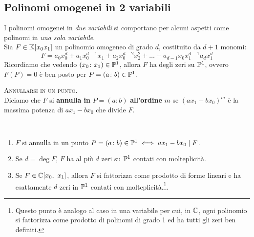 	\subsection{Polinomi omogenei in 2 variabili}
I polinomi omogenei in \textit{due variabili} si comportano per alcuni aspetti come polinomi in \textit{una sola variabile}.\\
Sia $F\in\mathbb{K}[x_0x_1]$ un polinomio omogeneo di grado $d$, costituito da $d+1$ monomi:
\begin{equation*}
	F=a_0x_0^d+a_1x_0^{d-1}x_1+a_2x_0^{d-2}x_2^2+\ldots + a_{d-1}x_0x_1^{d-1}a_dx_1^d
\end{equation*}
Ricordiamo che vedendo $\left(x_0\colon x_1\right)\in\proj[1]{\ }$, allora $F$ ha degli zeri su $\proj[1]{\ }$, ovvero $F\left(P\right)=0$ è ben posto per $P=(a\colon b)\in\proj[1]{\ }$.
\begin{define}\textsc{Annullarsi in un punto}.\\
	Diciamo che $F$ si \textbf{annulla in } $P=(a\colon b)$ \textbf{all'ordine } $m$ se $(ax_1-bx_0)^m$ è la massima potenza di $ax_1-bx_0$ che divide $F$.
\end{define}
\begin{proposition} \label{teo polinomi omogenei 2 variabili}~{}
	\begin{enumerate}
		\item	$F$ si annulla in un punto $P=(a\colon b)\in\proj[1]{\ } \iff ax_1-bx_0\mid F$.
		\item 	Se $d=\deg F$, $F$ ha al più $d$ zeri su $\proj[1]{\ }$ contati con molteplicità. %
		\item	Se $F\in\mathbb{C}[x_0,\ x_1]$, allora $F$ si fattorizza come prodotto di forme lineari e ha esattamente $d$ zeri in $\proj[1]{\ }$ contati con molteplicità.\footnote{Questo punto è analogo al caso in una variabile per cui, in $\mathbb{C}$, ogni polinomio si fattorizza come prodotto di polinomi di grado 1 ed ha tutti gli zeri ben definiti.}.
	\end{enumerate}
\vspace{-3mm}
\end{proposition}
